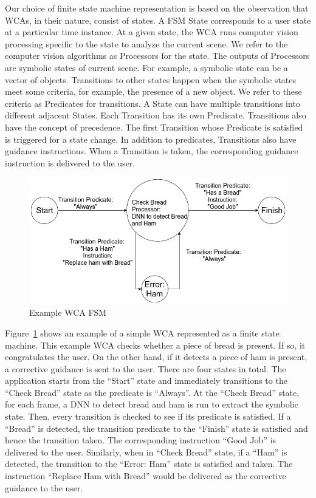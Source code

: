 Our choice of finite state machine representation is based on the observation
that WCAs, in their nature, consist of states. A FSM State corresponds to a
user state at a particular time instance. At a given state, the WCA runs
computer vision processing specific to the state to analyze the current scene.
We refer to the computer vision algorithms as Processors for the state. The
outputs of Processors are symbolic states of current scene. For example, a
symbolic state can be a vector of objects. Transitions to other states
happen when the symbolic states meet some criteria, for example, the presence of
a new object. We refer to these criteria as Predicates for transitions. A
State can have multiple transitions into different adjacent States. Each
Transition has its own Predicate. Transitions also have the concept
of precedence. The first Transition whose Predicate is satisfied is
triggered for a state change. In addition to predicates, Transitions also
have guidance instructions. When a Transition is taken, the corresponding
guidance instruction is delivered to the user.


\begin{figure}
  \centering
  \includegraphics[trim={0 0 0 0},width=\linewidth]{FIGS/fsm-example}
  \caption{Example WCA FSM}
  \label{figs:fsm-example}
\end{figure}

Figure~\ref{figs:fsm-example} shows an example of a simple WCA represented as a
finite state machine. This example WCA checks whether a piece of bread is
present. If so, it congratulates the user. On the other hand, if it detects a
piece of ham is present, a corrective guidance is sent to the user. There are
four states in total. The application starts from the ``Start'' state and
immediately transitions to the ``Check Bread'' state as the predicate is
``Always''. At the ``Check Bread'' state, for each frame, a DNN to detect bread
and ham is run to extract the symbolic state. Then, every transition is checked
to see if its predicate is satisfied. If a ``Bread'' is detected, the transition
predicate to the ``Finish'' state is satisfied and hence the transition taken.
The corresponding instruction ``Good Job'' is delivered to the user. Similarly,
when in ``Check Bread'' state, if a ``Ham'' is detected, the transition to the
``Error: Ham'' state is satisfied and taken. The instruction ``Replace Ham with
Bread'' would be delivered as the corrective guidance to the user.

